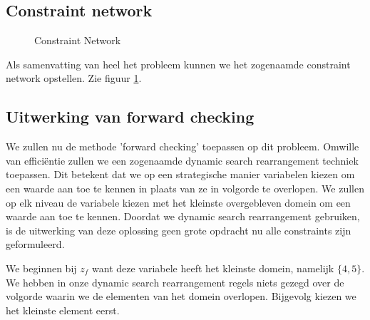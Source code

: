 \documentclass[alternative-exam.tex]{subfiles}
\begin{document}
\subsection{Constraint network}
\begin{figure}[H]
\caption{Constraint Network}
\label{fig:fourTeachersConstraintNetwork}
\centering
{}
\end{figure}
Als samenvatting van heel het probleem kunnen we het zogenaamde constraint network opstellen. Zie figuur \ref{fig:fourTeachersConstraintNetwork}.

\subsection{Uitwerking van forward checking}
We zullen nu de methode 'forward checking' toepassen op dit probleem. Omwille van effici\"entie zullen we een zogenaamde dynamic search rearrangement techniek toepassen. Dit betekent dat we op een strategische manier variabelen kiezen om een waarde aan toe te kennen in plaats van ze in volgorde te overlopen. We zullen op elk niveau de variabele kiezen met het kleinste overgebleven domein om een waarde aan toe te kennen.
Doordat we dynamic search rearrangement gebruiken, is de uitwerking van deze oplossing geen grote opdracht nu alle constraints zijn geformuleerd.

We beginnen bij $z_f$ want deze variabele heeft het kleinste domein, namelijk $\{4,5\}$. We hebben in onze dynamic search rearrangement regels niets gezegd over de volgorde waarin we de elementen van het domein overlopen. Bijgevolg kiezen we het kleinste element eerst.
\end{document}
